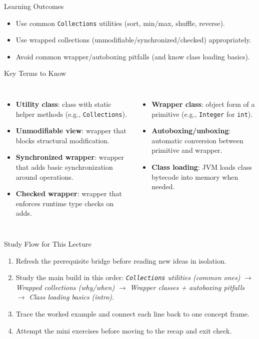 \documentclass{beamer}
\begin{document}
\begin{frame}{Learning Outcomes}
  \begin{itemize}[<+->]
    \item Use common \texttt{Collections} utilities (sort, min/max, shuffle, reverse).
    \item Use wrapped collections (unmodifiable/synchronized/checked) appropriately.
    \item Avoid common wrapper/autoboxing pitfalls (and know class loading basics).
  \end{itemize}
  \slidesources{\OOPSUnitVSources}
\end{frame}

\begin{frame}{Key Terms to Know}
\small
\begin{columns}[t]
\begin{itemize}
  \item \textbf{Utility class}: class with static helper methods (e.g., \texttt{Collections}).
  \item \textbf{Unmodifiable view}: wrapper that blocks structural modification.
  \item \textbf{Synchronized wrapper}: wrapper that adds basic synchronization around operations.
  \item \textbf{Checked wrapper}: wrapper that enforces runtime type checks on adds.
\end{itemize}
\begin{itemize}
  \item \textbf{Wrapper class}: object form of a primitive (e.g., \texttt{Integer} for \texttt{int}).
  \item \textbf{Autoboxing/unboxing}: automatic conversion between primitive and wrapper.
  \item \textbf{Class loading}: JVM loads class bytecode into memory when needed.
\end{itemize}
\end{columns}
  \slidesources{\OOPSUnitVSources}
\end{frame}

\begin{frame}{Study Flow for This Lecture}
\begin{enumerate}[<+->]
  \item Refresh the prerequisite bridge before reading new ideas in isolation.
  \item Study the main build in this order: \textit{\texttt{Collections} utilities (common ones)} $\rightarrow$ \textit{Wrapped collections (why/when)} $\rightarrow$ \textit{Wrapper classes + autoboxing pitfalls} $\rightarrow$ \textit{Class loading basics (intro)}.
  \item Trace the worked example and connect each line back to one concept frame.
  \item Attempt the mini exercises before moving to the recap and exit check.
\end{enumerate}
  \slidesources{\OOPSUnitVSources}
\end{frame}
\end{document}
